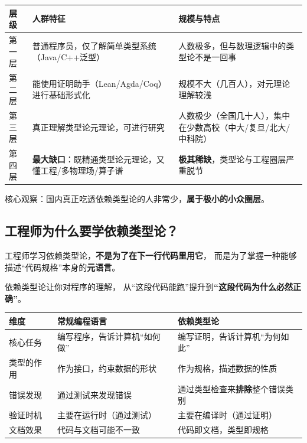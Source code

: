 \documentclass[10pt, openany]{book}
\begin{document}
\begin{table}[h]
\centering
\begin{tabular}{p{2.5cm} p{5cm} p{4.5cm}}
\toprule
\textbf{层级} & \textbf{人群特征} & \textbf{规模与特点} \\
\midrule
第一层 & 普通程序员，仅了解简单类型系统（Java/C++泛型） & 人数极多，但与数理逻辑中的类型论不是一回事 \\
第二层 & 能使用证明助手（Lean/Agda/Coq）进行基础形式化 & 规模不大（几百人），对元理论理解较浅 \\
第三层 & 真正理解类型论元理论，可进行研究 & 人数极少（全国几十人），集中在少数高校（中大/复旦/北大/中科院） \\
第四层 & \textbf{最大缺口}：既精通类型论元理论，又懂工程/多物理场/算子谱 & \textbf{极其稀缺}，类型论与工程圈层严重脱节 \\
\bottomrule
\end{tabular}
\end{table}

\begin{framed}
\centering
\large 核心观察：国内真正吃透依赖类型论的人非常少，\textbf{属于极小的小众圈层}。\cite{JackZhu2026TypeTheory}
\end{framed}

\subsection{工程师为什么要学依赖类型论？}

工程师学习依赖类型论，\textbf{不是为了在下一行代码里用它}，
而是为了掌握一种能够描述“代码规格”本身的\textbf{元语言}。

\begin{principle}[工程师的元能力]
依赖类型论让你对程序的理解，
从“这段代码能跑”提升到\textbf{“这段代码为什么必然正确”}。
\end{principle}

\begin{table}[h]
\centering
\begin{tabular}{p{3.5cm} p{5cm} p{4.5cm}}
\toprule
\textbf{维度} & \textbf{常规编程语言} & \textbf{依赖类型论} \\
\midrule
核心任务 & 编写程序，告诉计算机“如何做” & 编写证明，告诉计算机“为何如此” \\
类型的作用 & 作为接口，约束数据的形状 & 作为规格，描述数据的性质 \\
错误发现 & 通过测试来发现错误 & 通过类型检查来\textbf{排除}整个错误类别 \\
验证时机 & 主要在运行时（通过测试） & 主要在编译时（通过证明） \\
文档效果 & 代码与文档可能不一致 & 代码即文档，类型即规格 \\
\bottomrule
\end{tabular}
\end{table}
\end{document}
